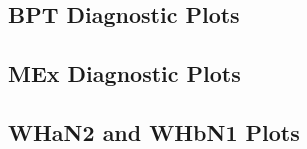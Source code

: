 	\subsection{BPT Diagnostic Plots}
		\label{subsec:BPT}


	\subsection{MEx Diagnostic Plots}
		\label{subsec:MEx}


	\subsection{WHaN2 and WHbN1 Plots}
		\label{subsec:WHaN2}


